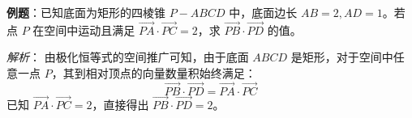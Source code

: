 \begin{examplebox}
\textbf{例题}：已知底面为矩形的四棱锥 $P-ABCD$ 中，底面边长 $AB=2, AD=1$。若点 $P$ 在空间中运动且满足 $\vec{PA} \cdot \vec{PC} = 2$，求 $\vec{PB} \cdot \vec{PD}$ 的值。

\textit{解析}：
由极化恒等式的空间推广可知，由于底面 $ABCD$ 是矩形，对于空间中任意一点 $P$，其到相对顶点的向量数量积始终满足：
\[ \vec{PB} \cdot \vec{PD} = \vec{PA} \cdot \vec{PC} \]
已知 $\vec{PA} \cdot \vec{PC} = 2$，直接得出 $\vec{PB} \cdot \vec{PD} = 2$。
\end{examplebox}